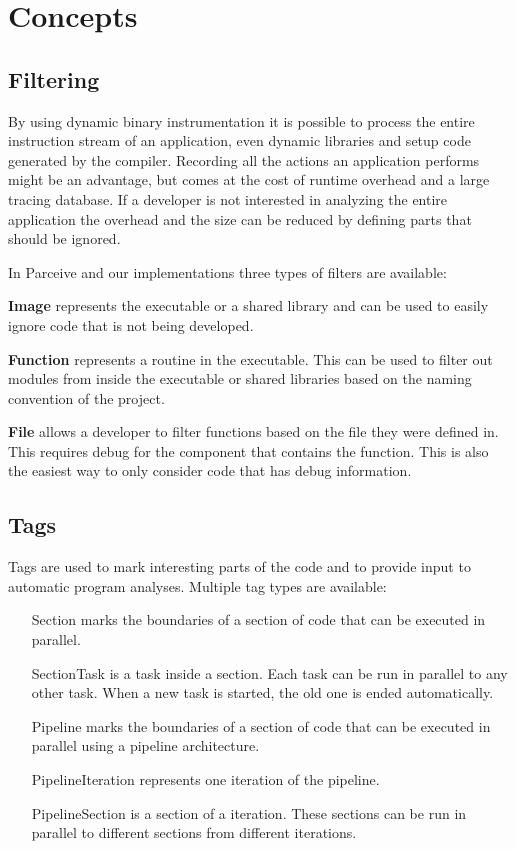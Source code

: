 \section{Concepts}

\subsection{Filtering}

By using dynamic binary instrumentation it is possible to process the entire instruction stream of an application, even dynamic libraries and setup code generated by the compiler. Recording all the actions an application performs might be an advantage, but comes at the cost of runtime overhead and a large tracing database. If a developer is not interested in analyzing the entire application the overhead and the size can be reduced by defining parts that should be ignored.

In Parceive and our implementations three types of filters are available:

\textbf{Image} represents the executable or a shared library and can be used to easily ignore code that is not being developed.

\textbf{Function} represents a routine in the executable. This can be used to filter out modules from inside the executable or shared libraries based on the naming convention of the project.

\textbf{File} allows a developer to filter functions based on the file they were defined in. This requires debug for the component that contains the function. This is also the easiest way to only consider code that has debug information.

\subsection{Tags}

Tags are used to mark interesting parts of the code and to provide input to automatic program analyses. Multiple tag types are available:

\begin{itemize}
	\item [Section] marks the boundaries of a section of code that can be executed in parallel.
	\item [SectionTask] is a task inside a section. Each task can be run in parallel to any other task. When a new task is started, the old one is ended automatically.
	\item [Pipeline] marks the boundaries of a section of code that can be executed in parallel using a pipeline architecture.
	\item [PipelineIteration] represents one iteration of the pipeline.
	\item [PipelineSection] is a section of a iteration. These sections can be run in parallel to different sections from different iterations.
\end{itemize}

